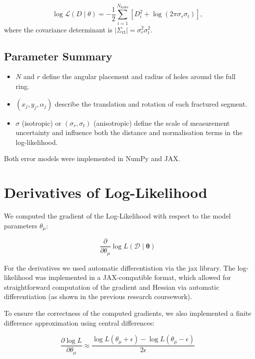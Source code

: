 \documentclass[a4paper,12pt]{article}
\begin{document}
\begin{equation}
    \log \mathcal{L}(D \mid \theta) = -\frac{1}{2} \sum_{i=1}^{N_{\text{holes}}} \left[ D_i^2 + \log(2\pi \sigma_r \sigma_t) \right],
\end{equation}
where the covariance determinant is $|\Sigma_{\text{rt}}| = \sigma_r^2 \sigma_t^2$.

\subsection{Parameter Summary}

\begin{itemize}
    \item $N$ and $r$ define the angular placement and radius of holes around the full ring.
    \item $(x_j, y_j, \alpha_j)$ describe the translation and rotation of each fractured segment.
    \item $\sigma$ (isotropic) or $(\sigma_r, \sigma_t)$ (anisotropic) define the scale of measurement uncertainty and influence both the distance and normalisation terms in the log-likelihood.
\end{itemize}

Both error models were implemented in NumPy and JAX.

\section{Derivatives of Log-Likelihood}

We computed the gradient of the Log-Likelihood with respect to the model parameters $\theta_\mu$:

\begin{equation}
\frac{\partial}{\partial \theta_\mu} \log L(\mathcal{D} \mid \boldsymbol{\theta})
\end{equation}

For the derivatives we used automatic differentiation via the jax library. The log-likelihood was implemented in a JAX-compatible format, which allowed for straightforward computation of the gradient and Hessian via automatic differentiation (as shown in the previous research coursework).

To ensure the correctness of the computed gradients, we also implemented a finite difference approximation using central differences:

\begin{equation}
\frac{\partial \log L}{\partial \theta_\mu} \approx \frac{\log L(\theta_\mu + \epsilon) - \log L(\theta_\mu - \epsilon)}{2\epsilon}
\end{equation}
\end{document}
